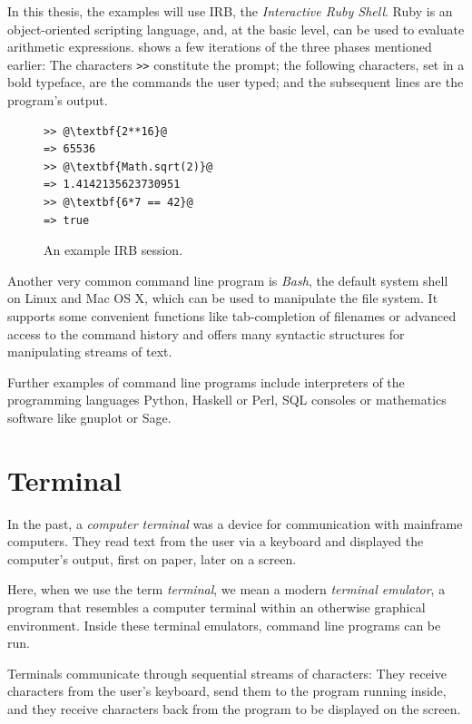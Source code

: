\documentclass[paper=a4,abstract=on,cleardoublepage=empty,numbers=noenddot,toc=bib,12pt,appendixprefix=true]{scrreprt}
\begin{document}
In this thesis, the examples will use IRB, the \emph{Interactive Ruby Shell}. Ruby is an object-oriented scripting language, and, at the basic level, can be used to evaluate arithmetic expressions.  shows a few iterations of the three phases mentioned earlier: The characters \texttt{>\->} constitute the prompt; the following characters, set in a bold typeface, are the commands the user typed; and the subsequent lines are the program's output.

\begin{figure}[tb]
    \begin{lstlisting}[escapechar=@,frame=shadowbox]
>> @\textbf{2**16}@
=> 65536
>> @\textbf{Math.sqrt(2)}@
=> 1.4142135623730951
>> @\textbf{6*7 == 42}@
=> true
    \end{lstlisting}
    \centering
    \caption{An example IRB session.}
    \label{fig:irb}
\end{figure}

\label{sec:cliexamples}

Another very common command line program is \emph{Bash}, the default system shell on Linux and Mac OS X, which can be used to manipulate the file system. It supports some convenient functions like tab-completion of filenames or advanced access to the command history and offers many syntactic structures for manipulating streams of text.

Further examples of command line programs include interpreters of the programming languages Python, Haskell or Perl, SQL consoles or mathematics software like gnuplot or Sage.

\section{Terminal}

In the past, a \emph{computer terminal} was a device for communication with mainframe computers. They read text from the user via a keyboard and displayed the computer's output, first on paper, later on a screen.

Here, when we use the term \emph{terminal}, we mean a modern \emph{terminal emulator}, a program that resembles a computer terminal within an otherwise graphical environment. Inside these terminal emulators, command line programs can be run.

Terminals communicate through sequential streams of characters: They receive characters from the user's keyboard, send them to the program running inside, and they receive characters back from the program to be displayed on the screen.
\end{document}
